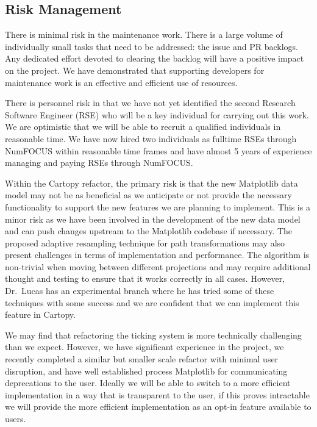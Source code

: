 \documentclass[12pt]{article}
\numberwithin{page}{section}
\begin{document}
\subsection{Risk Management}

There is minimal risk in the maintenance work.  There is a large volume
of individually small tasks that need to be addressed: the issue and
PR backlogs.  Any dedicated effort devoted to clearing the backlog
will have a positive impact on the project.  We have demonstrated that
supporting developers for maintenance work is an effective and
efficient use of resources.


There is personnel risk in that we have not yet identified the second Research
Software Engineer (RSE) who will be a key individual for carrying out this
work.  We are optimistic that we will be able to recruit a qualified
individuals in reasonable time.  We have now hired two individuals as fulltime
RSEs through NumFOCUS within reasonable time frames and have almost 5 years of
experience managing and paying RSEs through NumFOCUS.


Within the Cartopy refactor, the primary risk is that the new Matplotlib data
model may not be as beneficial as we anticipate or not provide the necessary
functionality to support the new features we are planning to implement. This is
a minor risk as we have been involved in the development of the new data model
and can push changes upstream to the Matplotlib codebase if necessary.
The proposed adaptive resampling technique for path transformations may also
present challenges in terms of implementation and performance. The algorithm
is non-trivial when moving between different projections and may require additional
thought and testing to ensure that it works correctly in all cases.
However, Dr.\ Lucas has an experimental branch where he has tried some of these
techniques with some success and we are confident that we can implement this
feature in Cartopy.

We may find that refactoring the ticking system is more technically challenging
than we expect.  However, we have significant experience in the project, we
recently completed a similar but smaller scale refactor with minimal user
disruption, and have well established process Matplotlib for communicating
deprecations to the user.  Ideally we will be able to switch to a more
efficient implementation in a way that is transparent to the user, if this proves
intractable we will provide the more efficient implementation as an opt-in feature
available to users.
\end{document}
